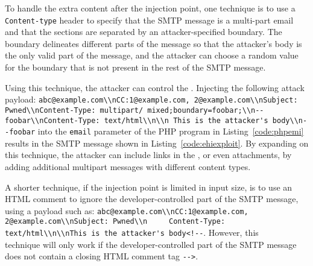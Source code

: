To handle the extra content after the injection point, one technique
is to use a \lstinline{Content-type} header to specify that the SMTP
message is a multi-part email and that the sections are separated by
an attacker-specified boundary. The boundary delineates different
parts of the message so that the attacker's body is the only valid
part of the message, and the attacker can choose a random value for
the boundary that is not present in the rest of the SMTP message.

Using this technique, the attacker can control the \email.
Injecting the following attack payload:
\texttt{\lstinline{abc@example.com\\nCC:1@example.com, 2@example.com\\nSubject: Pwned\\nContent-Type: multipart/ mixed;boundary=foobar;\\n--foobar\\nContent-Type: text/html\\n\\n This is the attacker's body\\n--foobar}} into the \lstinline{email} parameter
of the PHP program in Listing~\ref{code:phpemi} results in
the SMTP message shown in Listing~\ref{code:ehiexploit}.
By expanding on this technique, the attacker can include links in the
\email, or even attachments, by adding additional multipart messages
with different content types.

A shorter technique, if the injection point is limited in input
size, is to use an HTML comment to ignore the developer-controlled
part of the SMTP message, using a payload such as:
\texttt{\lstinline{abc@example.com\\nCC:1@example.com, 2@example.com\\nSubject: Pwned\\n
    Content-Type: text/html\\n\\nThis is the attacker's body<!--}}. However, this \\technique will only work if the developer-controlled part of the SMTP
message does not contain a closing HTML comment tag
\texttt{\lstinline{-->}}.

